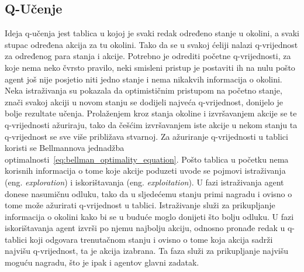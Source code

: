 \subsection{Q-Učenje}
Ideja q-učenja jest tablica u kojoj je svaki redak određeno stanje u okolini, a svaki stupac određena akcija za tu okolini. Tako da se u svakoj ćeliji nalazi q-vrijednost za određenog para stanja i akcije. Potrebno je odrediti početne q-vrijednosti, za koje nema neko čvrsto pravilo, neki smisleni pristup je postaviti ih na nulu pošto agent još nije posjetio niti jedno stanje i nema nikakvih informacija o okolini. Neka istraživanja su pokazala da optimističnim pristupom na početno stanje, znači svakoj akciji u novom stanju se dodijeli najveća q-vrijednost, donijelo je bolje rezultate učenja. Prolaženjem kroz stanja okoline i izvršavanjem akcije se te q-vrijednosti ažuriraju, tako da češćim izvršavanjem iste akcije u nekom stanju ta q-vrijednost se sve više približava stvarnoj. Za ažuriranje q-vrijednosti u tablici koristi se Bellmannova jednadžba optimalnosti~\ref{eq:bellman_optimality_equation}. Pošto tablica u početku nema korisnih informacija o tome koje akcije poduzeti uvode se pojmovi istraživanja (eng. \textit{exploration}) i iskorištavanja (eng. \textit{exploitation}). U fazi istraživanja agent donese nasumičnu odluku, tako da u sljedećemu stanju primi nagradu i ovisno o tome može ažurirati q-vrijednost u tablici. Istraživanje služi za prikupljanje informacija o okolini kako bi se u buduće moglo donijeti što bolju odluku. U fazi iskorištavanja agent izvrši po njemu najbolju akciju, odnosno pronađe redak u q-tablici koji odgovara trenutačnom stanju i ovisno o tome koja akcija sadrži najvišu q-vrijednost, ta je akcija izabrana. Ta faza služi za prikupljanje najvišu moguću nagradu, što je ipak i agentov glavni zadatak. 

